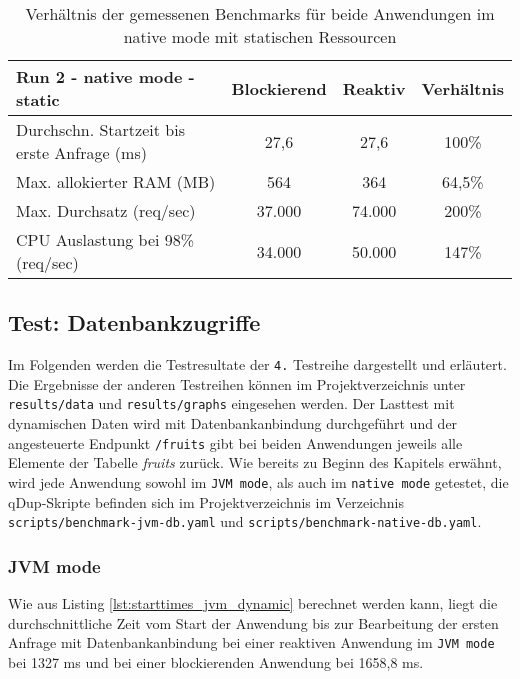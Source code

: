 \begin{table}[ht!]
    \begin{tabular}{|l | c | c | c|}
        \hline
        Run 2 - native mode - static & Blockierend & Reaktiv & Verhältnis \\
        \hline
        \makecell[l]{Durchschn. Startzeit bis                             \\erste Anfrage (ms)} &   27,6    &  27,6  &   100\%   \\
        \hline
        Max. allokierter RAM (MB)    & 564         & 364     & 64,5\%     \\
        \hline
        Max. Durchsatz (req/sec)     & 37.000      & 74.000  & 200\%      \\
        \hline
        \makecell[l]{CPU Auslastung bei 98\%                              \\ (req/sec)} & 34.000 & 50.000 & 147\%  \\
        \hline
    \end{tabular}
    \caption{Verhältnis der gemessenen Benchmarks für beide Anwendungen im native mode mit statischen Ressourcen}
    \label{table:static_native_measurement_results}
\end{table}
\newpage
\subsection{Test: Datenbankzugriffe}
\label{section:datenbankzugriffe}
Im Folgenden werden die Testresultate der \verb|4.| Testreihe dargestellt und erläutert.
Die Ergebnisse der anderen Testreihen können im Projektverzeichnis unter \verb|results/data| und \verb|results/graphs| eingesehen werden.
Der Lasttest mit dynamischen Daten wird mit Datenbankanbindung durchgeführt und der angesteuerte Endpunkt \verb|/fruits| gibt bei beiden Anwendungen
jeweils alle Elemente der Tabelle \textit{fruits} zurück. Wie bereits zu Beginn des Kapitels erwähnt, wird jede Anwendung sowohl im \verb|JVM mode|, als auch im
\verb|native mode| getestet, die qDup-Skripte befinden sich im Projektverzeichnis im Verzeichnis \verb|scripts/benchmark-jvm-db.yaml| und
\verb|scripts/benchmark-native-db.yaml|.

\subsubsection{JVM mode}
\label{subsubsec:dynamic_jvm_mode}
Wie aus Listing \ref{lst:starttimes_jvm_dynamic} berechnet werden kann, liegt die durchschnittliche Zeit vom Start der Anwendung bis zur
Bearbeitung der ersten Anfrage mit Datenbankanbindung bei einer reaktiven Anwendung im \verb|JVM mode| bei 1327 ms und bei einer
blockierenden Anwendung bei 1658,8 ms.

